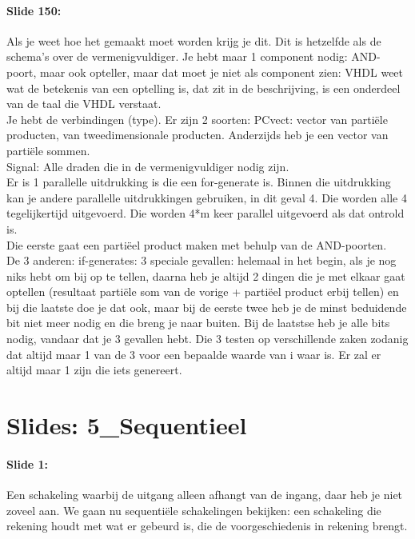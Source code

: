 \documentclass[10pt,a4paper]{book}
\begin{document}
\paragraph{Slide 150:} Als je weet hoe het gemaakt moet worden krijg je dit. Dit is hetzelfde als de schema's over de vermenigvuldiger. Je hebt maar 1 component nodig: AND-poort, maar ook opteller, maar dat moet je niet als component zien: VHDL weet wat de betekenis van een optelling is, dat zit in de beschrijving, is een onderdeel van de taal die VHDL verstaat.\\
Je hebt de verbindingen (type). Er zijn 2 soorten: PCvect: vector van parti\"ele producten, van tweedimensionale producten. Anderzijds heb je een vector van parti\"ele sommen.\\
Signal: Alle draden die in de vermenigvuldiger nodig zijn.\\
Er is 1 parallelle uitdrukking is die een for-generate is. Binnen die uitdrukking kan je andere parallelle uitdrukkingen gebruiken, in dit geval 4. Die worden alle 4 tegelijkertijd uitgevoerd. Die worden 4*m keer parallel uitgevoerd als dat ontrold is.\\
Die eerste gaat een parti\"eel product maken met behulp van de AND-poorten.\\
De 3 anderen: if-generates: 3 speciale gevallen: helemaal in het begin, als je nog niks hebt om bij op te tellen, daarna heb je altijd 2 dingen die je met elkaar gaat optellen (resultaat parti\"ele som van de vorige + parti\"eel product erbij tellen) en bij die laatste doe je dat ook, maar bij de eerste twee heb je de minst beduidende bit niet meer nodig en die breng je naar buiten. Bij de laatstse heb je alle bits nodig, vandaar dat je 3 gevallen hebt. Die 3 testen op verschillende zaken zodanig dat altijd maar 1 van de 3 voor een bepaalde waarde van i waar is.  Er zal er altijd maar 1 zijn die iets genereert.

\section{Slides: 5\_Sequentieel} 

\paragraph{Slide 1:} Een schakeling waarbij de uitgang alleen afhangt van de ingang, daar heb je niet zoveel aan. We gaan nu sequenti\"ele schakelingen bekijken: een schakeling die rekening houdt met wat er gebeurd is, die de voorgeschiedenis in rekening brengt.
\end{document}
